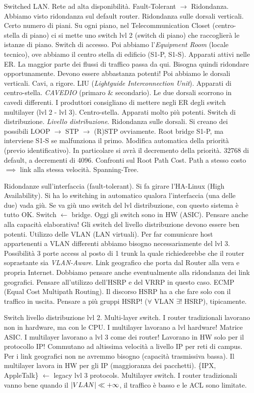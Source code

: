Switched LAN. Rete ad alta disponibilità. Fault-Tolerant $\rightarrow$ Ridondanza. Abbiamo visto ridondanza sul default router. Ridondanza sulle dorsali verticali. Certo numero di piani. Su ogni piano, nel Telecommunication Closet (centro-stella di piano) ci si mette uno switch lvl 2 (switch di piano) che raccoglierà le istanze di piano. Switch di accesso. Poi abbiamo l'\textit{Equipment Room} (locale tecnico), ove abbiamo il centro stella di edificio (S1-P, S1-S). Apparati attivi nelle ER. La maggior parte dei flussi di traffico passa da qui. Bisogna quindi ridondare opportunamente. Devono essere abbastanza potenti! Poi abbiamo le dorsali verticali. Cavi, a rigore. LIU (\textit{Lightguide Interconnection Unit}). Apparati di centro-stella. \textit{CAVEDIO} (primaro \& secondario). Le due dorsali scorrono in cavedi differenti. I produttori consigliano di mettere negli ER degli switch multilayer (lvl 2 - lvl 3). Centro-stella. Apparati molto più potenti. Switch di distribuzione. \textit{Livello distribuzione}. Ridondanza sulle dorsali. Si creano dei possibili LOOP $\rightarrow$ STP $\rightarrow$ (R)STP ovviamente. Root bridge S1-P, ma interviene S1-S se malfunziona il primo. Modifica automatica della priorità (previo identificativo). In particolare si avrà il decremento della priorità. 32768 di default, a decrementi di 4096. Confronti sul Root Path Cost. Path a stesso costo $\implies$ link alla stessa velocità. Spanning-Tree.

Ridondanze sull'interfaccia (fault-tolerant). Si fa girare l'HA-Linux (High Availability). Si ha lo switching in automatico qualora l'interfaccia (una delle due) vada giù. Se va giù uno switch del lvl distribuzione, con questo sistema è tutto OK. Switch $\leftarrow$ bridge. Oggi gli switch sono in HW (ASIC). Pensare anche alla capacità elaborativa! Gli switch del livello distribuzione devono essere ben potenti. Utilizzo delle VLAN (LAN virtuali). Per far comunicare host appartenenti a VLAN differenti abbiamo bisogno necessariamente del lvl 3. Possibilità 3 porte access al posto di 1 trunk la quale richiederebbe che il router soprastante sia \textit{VLAN-Aware}. Link geografico che porta dal Router alla vera e propria Internet. Dobbiamo pensare anche eventualmente alla ridondanza dei link geografici. Pensare all'utilizzo dell'HSRP e del VRRP in questo caso. ECMP (Equal Cost Multipath Routing). Il discorso HSRP ha a che fare solo con il traffico in uscita. Pensare a più gruppi HSRP! ($\forall$ VLAN $\exists!$ HSRP), tipicamente.

Switch livello distribuzione lvl 2. Multi-layer switch. I router tradizionali lavorano non in hardware, ma con le CPU. I multilayer lavorano a lvl hardware! Matrice ASIC. I multilayer lavorano a lvl 3 come dei router! Lavorano in HW solo per il protocollo IP! Commutano ad altissima velocità a livello IP per reti di campus. Per i link geografici non ne avremmo bisogno (capacità trasmissiva bassa). Il multilayer lavora in HW per gli IP (maggioranza dei pacchetti). \{IPX, AppleTalk\} $\leftarrow$ legacy lvl 3 protocols. Multilayer switch. I router tradizionali vanno bene quando il $\left\vert{VLAN}\right\vert \ll +\infty$, il traffico è basso e le ACL sono limitate.

